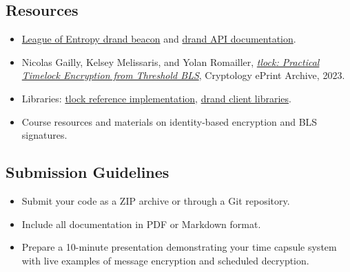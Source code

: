 \documentclass[10pt,a4paper,american]{exam}
\begin{document}
\subsection*{Resources}
\begin{itemize}
	\item \href{https://drand.love/}{League of Entropy drand beacon} and \href{https://api.drand.sh/}{drand API documentation}.
	\item Nicolas Gailly, Kelsey Melissaris, and Yolan Romailler, \href{https://appliedcryptography.page/paper/\#tlock-bls}{\emph{tlock: Practical Timelock Encryption from Threshold BLS}}, Cryptology ePrint Archive, 2023.
	\item Libraries: \href{https://github.com/drand/tlock}{tlock reference implementation}, \href{https://github.com/drand/drand-client}{drand client libraries}.
	\item Course resources and materials on identity-based encryption and BLS signatures.
\end{itemize}

\subsection*{Submission Guidelines}
\begin{itemize}
	\item Submit your code as a ZIP archive or through a Git repository.
	\item Include all documentation in PDF or Markdown format.
	\item Prepare a 10-minute presentation demonstrating your time capsule system with live examples of message encryption and scheduled decryption.
\end{itemize}
\end{document}
